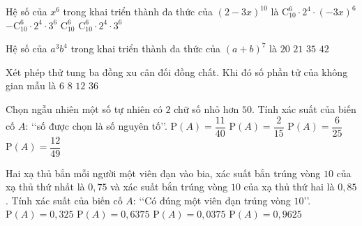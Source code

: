 \begin{ex}%
Hệ số của $x^6$ trong khai triển thành đa thức của $(2-3x)^{10}$ là
	\choice
	{$\mathrm{C}_{10}^6\cdot2^4\cdot(-3x)^6$}
	{$-\mathrm{C}_{10}^6\cdot2^4\cdot3^6$}
	{$\mathrm{C}_{10}^6$}
	{\True $\mathrm{C}_{10}^6\cdot2^4\cdot3^6$}
\end{ex}
\begin{ex}%
	Hệ số của $a^3b^4$ trong khai triển thành đa thức của ${\left(a+b\right)}^7$ là
	\choice
	{$20$}
	{$21$}
	{\True $35$}
	{$42$}
\end{ex}
\begin{ex}%
	Xét phép thử tung ba đồng xu cân đối đồng chất. Khi đó số phần tử của không gian mẫu là
	\choice
	{$6$}
	{\True $8$}
	{$12$}
	{$36$}
\end{ex}
\begin{ex}%
	Chọn ngẫu nhiên một số tự nhiên có $2$ chữ số nhỏ hơn $50$. Tính xác suất của biến cố $A$: \lq\lq số được chọn là số nguyên tố\rq\rq.
	\choice
	{\True $\mathrm{P}(A)=\dfrac{11}{40}$}
	{$\mathrm{P}(A)=\dfrac{2}{15}$}
	{$\mathrm{P}(A)=\dfrac{6}{25}$}
	{$\mathrm{P}(A)=\dfrac{12}{49}$}
\end{ex}
\begin{ex}%
	Hai xạ thủ bắn mỗi người một viên đạn vào bia, xác suất bắn trúng vòng $10$ của xạ thủ thứ nhất là $0{,}75$ và xác suất bắn trúng vòng $10$ của xạ thủ thứ hai là $0{,}85$. Tính xác suất của biến cố $A$: \lq\lq Có đúng một viên đạn trúng vòng $10$\rq\rq.
	\choice
	{\True $\mathrm{P}(A)=0{,}325$}
	{$\mathrm{P}(A)=0{,}6375$}
	{$\mathrm{P}(A)=0{,}0375$}
	{$\mathrm{P}(A)=0{,}9625$}
\end{ex}
